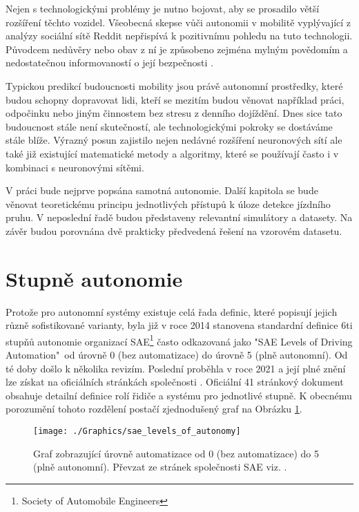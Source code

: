 \documentclass[czech, bc, kky, he, iso690numb]{fasthesis}
\begin{document}
		Nejen s technologickými problémy je nutno bojovat, aby se prosadilo větší rozšíření těchto vozidel. Všeobecná skepse vůči autonomii v mobilitě vyplývající z analýzy sociální sítě Reddit \cite{public_opinion_on_AV} nepřispívá k pozitivnímu pohledu na tuto technologii. Původcem nedůvěry nebo obav z ní je způsobeno zejména mylným povědomím a nedostatečnou informovaností o její bezpečnosti \cite{AV_vs_CV_crashes}.
		
		Typickou predikcí budoucnosti mobility jsou právě autonomní prostředky, které budou schopny dopravovat lidi, kteří se mezitím budou věnovat například práci, odpočinku nebo jiným činnostem bez stresu z denního dojíždění. Dnes sice tato budoucnost stále není skutečností, ale technologickými pokroky se dostáváme stále blíže. Výrazný posun zajistilo nejen nedávné rozšíření neuronových sítí ale také již existující matematické metody a algoritmy, které se používají často i v kombinaci s neuronovými sítěmi.
		
		V práci bude nejprve popsána samotná autonomie. Další kapitola se bude věnovat teoretickému principu jednotlivých přístupů k úloze detekce jízdního pruhu. V neposlední řadě budou představeny relevantní simulátory a datasety. Na závěr budou porovnána dvě prakticky předvedená řešení na vzorovém datasetu.
    
    \section{Stupně autonomie}
       	Protože pro autonomní systémy existuje celá řada definic, které popisují jejich různě sofistikované varianty, byla již v roce 2014 stanovena standardní definice 6ti stupňů autonomie organizací SAE\footnote{Society of Automobile Engineers} často odkazovaná jako "SAE Levels of Driving Automation\texttrademark"\ od úrovně 0 (bez automatizace) do  úrovně 5 (plně autonomní). Od té doby došlo k několika revizím. Poslední proběhla v roce 2021 a její plné znění lze získat na oficiálních stránkách společnosti \cite{SAE_autonomy_levels}. Oficiální 41 stránkový dokument obsahuje detailní definice rolí řidiče a systému pro jednotlivé stupně. K obecnému porozumění tohoto rozdělení postačí zjednodušený graf na Obrázku \ref{pic:levels_of_autonomy}.
       	
       		\begin{figure}[h]
       			\centering
       			\texttt{[image: ./Graphics/sae\_levels\_of\_autonomy]}
       			\caption{Graf zobrazující úrovně automatizace od 0 (bez automatizace) do 5 (plně autonomní). Převzat ze stránek společnosti SAE viz. \cite{SAE_autonomy_levels_web}.}
       			\label{pic:levels_of_autonomy}
       		\end{figure}
       	
\end{document}

